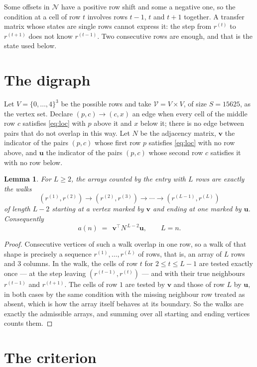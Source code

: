 \documentclass[11pt,a4paper]{article}
\theoremstyle{plain}
\newtheorem{lemma}[theorem]{Lemma}
\theoremstyle{definition}
\begin{document}
Some offsets in $\mathcal N$ have a positive row shift and some a negative one, so the
condition at a cell of row $t$ involves rows $t-1$, $t$ and $t+1$ together. A transfer
matrix whose states are single rows cannot express it: the step from $r^{(t)}$ to
$r^{(t+1)}$ does not know $r^{(t-1)}$. Two consecutive rows are enough, and that is
the state used below.

\section{The digraph}

Let $V=\{0,\dots,4\}^{3}$ be the possible rows and take
$\mathcal V=V\times V$, of size $S=15625$, as the vertex set. Declare $(p,c)\to(c,x)$ an edge
when every cell of the middle row $c$ satisfies \eqref{eq:loc} with $p$ above it and $x$
below it; there is no edge between pairs that do not overlap in this way. Let $N$ be the
adjacency matrix, $\mathbf{v}$ the indicator of the pairs $(p,c)$ whose first row $p$
satisfies \eqref{eq:loc} with no row above, and $\mathbf{u}$ the indicator of
the pairs $(p,c)$ whose second row $c$ satisfies it with no row below.

\begin{lemma}\label{lem:walk}
For $L\ge2$, the arrays counted by the entry with $L$ rows are exactly the walks
\[
(r^{(1)},r^{(2)})\to(r^{(2)},r^{(3)})\to\cdots\to(r^{(L-1)},r^{(L)})
\]
of length $L-2$ starting at a vertex marked by $\mathbf{v}$ and ending at one marked by
$\mathbf{u}$. Consequently
\[
a(n)\;=\;\,\mathbf{v}^{\!\top}N^{\,L-2}\mathbf{u},\qquad L=n .
\]
\end{lemma}

\begin{proof}
Consecutive vertices of such a walk overlap in one row, so a walk of that shape is
precisely a sequence $r^{(1)},\dots,r^{(L)}$ of rows, that is, an array of $L$ rows
and $3$ columns. In the walk, the cells of row $t$ for $2\le t\le L-1$ are tested
exactly once --- at the step leaving $(r^{(t-1)},r^{(t)})$ --- and with their true
neighbours $r^{(t-1)}$ and $r^{(t+1)}$. The cells of row $1$ are tested by
$\mathbf{v}$ and those of row $L$ by $\mathbf{u}$, in both cases by the same condition
with the missing neighbour row treated as absent, which is how the array itself behaves at
its boundary. So the walks are exactly the admissible arrays, and summing over all starting
and ending vertices counts them.
\end{proof}

\section{The criterion}
\end{document}

